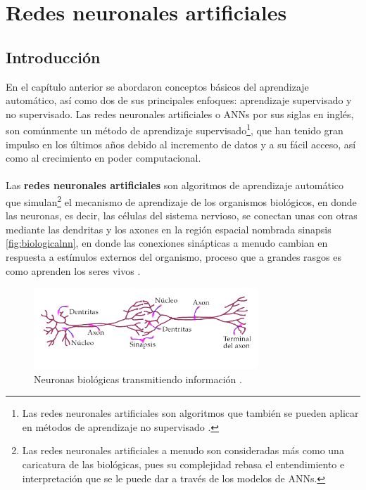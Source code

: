 \chapter{Redes neuronales artificiales}\label{ch:NNBasics}
\section{Introducción}

En el capítulo anterior se abordaron conceptos básicos del aprendizaje automático, así como dos de sus principales enfoques: aprendizaje supervisado y no supervisado. Las redes neuronales artificiales o \acs{ANN}s por sus siglas en inglés, son comúnmente un método de aprendizaje supervisado\footnote{Las redes neuronales artificiales son algoritmos que también se pueden aplicar en métodos de aprendizaje no supervisado \cite{Dike2018UnsupervisedLB}.}, que han tenido gran impulso en los últimos años debido al incremento de datos y a su fácil acceso, así como al crecimiento en poder computacional.
\\
\\
Las \textbf{redes neuronales artificiales}  son algoritmos de aprendizaje automático que simulan\footnote{Las redes neuronales artificiales a menudo son consideradas más como una caricatura de las biológicas, pues su complejidad rebasa el entendimiento e interpretación que se le puede dar a través de los modelos de \acs{ANN}s.} el mecanismo de aprendizaje de los organismos biológicos, en donde las neuronas, es decir, las células del sistema nervioso, se conectan unas con otras mediante las dendritas y los axones en la región espacial nombrada sinapsis \autoref{fig:biologicalnn}, en donde las conexiones sinápticas a menudo cambian en respuesta a estímulos externos del organismo, proceso que a grandes rasgos es como aprenden los seres vivos \cite{Nielsen:2018}.

\begin{figure}[hb]
  \centering
  \includegraphics[width=0.75\textwidth]{./img/BioloNN.png}
  \caption{Neuronas biológicas transmitiendo información \cite{Gardell:2010}.}
  \label{fig:biologicalnn}
\end{figure}


